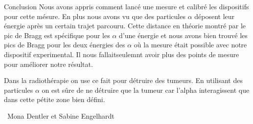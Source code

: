 \documentclass[a4paper,11pt,liststotocnumbered,bibtotocnumbered]{scrartcl}
\begin{document}
 
 \begin{section}{Conclusion}
  Nous avons appris comment lancé une mesure et calibré les dispositifs pour cette mésure. En plus nous avons vu que des particules $\alpha$ déposent leur énergie après un certain trajet parcouru. Cette distance en théorie montré par le pic de Bragg est spécifique pour les $\alpha$ d'une énergie et nous avons bien trouvé les pics de Bragg pour les deux énergies des $\alpha$ où la mesure était possible avec notre dispositif experimental. Il nous fallaitseulemnt avoir plus des points de mesure pour améliorer notre résultat.
  
  Dans la radiothérapie on use ce fait pour détruire des tumeurs. En utilisant des particules $\alpha$ on est sûre de ne détruire que la tumeur car l'alpha interagissent que dans cette pétite zone bien défini.
 \end{section}

 \vspace{1cm}
 \begin{flushright}
  \titlefont \textcopyleft\ Mona Dentler et Sabine Engelhardt
 \end{flushright}

\newpage
 
\end{document}
